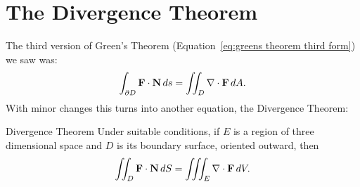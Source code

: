 \section{The Divergence Theorem}\label{sec:DivergenceTheorem}

The third version of Green's Theorem (Equation~\ref{eq:greens theorem third form}) we saw was:
$$\int_{\partial D} {\bf F}\cdot{\bf N}\,ds=\iint_{D} \nabla\cdot{\bf
  F}\,dA.$$ With minor changes this turns into another equation, the
Divergence Theorem:

\begin{theorem}{Divergence Theorem}{}
Under suitable conditions, if $E$ is a
region of three dimensional space and $D$ is its boundary surface,
oriented outward, then
$$\iint_{D} {\bf F}\cdot{\bf N}\,dS=\iiint_{E} \nabla\cdot{\bf F}\,dV.$$
\end{theorem}
\goodbreak
